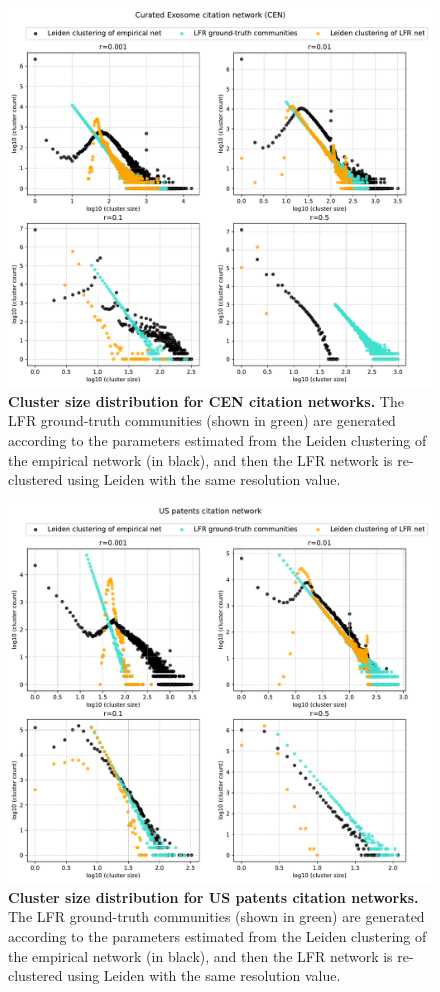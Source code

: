 \documentclass[a4paper]{article}   	%
\begin{document}
\begin{figure}[H]
\centering
\includegraphics[width=0.85\linewidth]{figs/cen_cm_size.pdf}
\caption[Cluster size distribution for CEN citation networks.]{\textbf{Cluster size distribution for CEN citation networks.} The LFR ground-truth communities (shown in green) are generated according to the parameters estimated from the Leiden clustering of the empirical network (in black), and then the LFR network is re-clustered using Leiden with the same resolution value. }
\end{figure}

\begin{figure}[H]
\centering
\includegraphics[width=0.85\linewidth]{figs/cit_patents_cm_size.pdf}
\caption[Cluster size distribution for US patents citation networks.]{\textbf{Cluster size distribution for US patents citation networks.} The LFR ground-truth communities (shown in green) are generated according to the parameters estimated from the Leiden clustering of the empirical network (in black), and then the LFR network is re-clustered using Leiden with the same resolution value. }
\end{figure}
\end{document}
